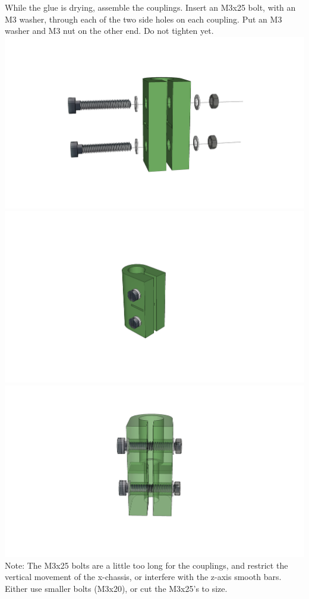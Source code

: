 \documentclass[twoside,a4paper,titlepage]{memoir}
\begin{document}
	\section{}
	While the glue is drying, assemble the couplings. Insert an M3x25 bolt, with an M3 washer, through
	each of the two side holes on each coupling. Put an M3 washer and M3 nut on the other end. Do not
	tighten yet.\\
	\includegraphics[width=1\linewidth]{graphics/ch8_13_1.png}
	\includegraphics[width=1\linewidth]{graphics/ch8_13_2.png}
	\includegraphics[width=1\linewidth]{graphics/ch8_13_3.png}
	Note: The M3x25 bolts are a little too long for the couplings, and restrict the
	vertical movement of the x-chassis, or interfere with the z-axis smooth bars.
	Either use smaller bolts (M3x20), or cut the M3x25's to size.
	
\end{document}
